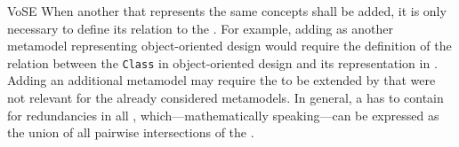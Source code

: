 \begin{copiedFrom}{VoSE}
When another \concretemetamodel that represents the same concepts shall be added, it is only necessary to define its relation to the \conceptmetamodel.
For example, adding \cplusplus as another metamodel representing object-oriented design would require the definition of the relation between the \texttt{Class} \commonality in object-oriented design and its representation in \cplusplus.
Adding an additional metamodel may require the \conceptmetamodel to be extended by \commonalities that were not relevant for the already considered metamodels.
In general, a \conceptmetamodel has to contain \commonalities for redundancies in all \concretemetamodels, which---mathematically speaking---can be expressed as the union of all pairwise intersections of the \concretemetamodels.

\end{copiedFrom} %


